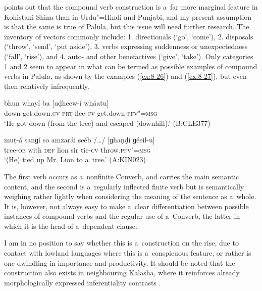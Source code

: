 \citet[20]{schmidt2004} points out that the compound verb construction is a~far more marginal feature in Kohistani Shina than in Urdu"=Hindi and Punjabi, and my present assumption is that the same is true of Palula, but this issue will need further research. The inventory of vectors commonly include: 1. directionals (`go', `come'), 2. disposals (`throw', `send', `put aside'), 3. verbs expressing suddenness or unexpectedness (`fall', `rise'), and 4. auto- and other benefactives (`give', `take'). Only categories 1 and 2 seem to appear in what can be termed as possible examples of compound verbs in Palula, as shown by the examples (\ref{ex:8-26}) and (\ref{ex:8-27}), but even then relatively infrequently. 

\begin{exe}
\ex
\label{ex:8-26}
\gll bhun whayí ba [uḍheew-í wháatu] \\
down get.down.\textsc{cv} \textsc{prt} flee-\textsc{cv} get.down-\textsc{pfv"=msg} \\
\glt `He got down (from the tree) and escaped (downhill).' (B:CLE377)
\end{exe}
\begin{exe}
\ex
\label{ex:8-27}
\gll muṭ-á sanɡí so amzarái seéb /{\ldots}/ [ɡhaṇḍí ɡéeil-u] \\
tree-\textsc{ob} with \textsc{def} lion sir {} tie-\textsc{cv} throw.\textsc{pfv"=msg} \\
\glt `(He) tied up Mr. Lion to a~tree.' (A:KIN023)
\end{exe}

The first verb occurs as a~nonfinite Converb, and carries the main semantic content, and the second is a~regularly inflected finite verb but is semantically weighing rather lightly when considering the meaning of the sentence as a~whole. It is, however, not always easy to make a~clear differentiation between possible instances of compound verbs and the regular use of a~Converb, the latter in which it is the head of a~dependent clause. 



I am in no position to say whether this is a~construction on the rise, due to contact with lowland languages where this is a~conspicuous feature, or rather is one dwindling in importance and productivity. It should be noted that the construction also exists in neighbouring Kalasha, where it reinforces already morphologically expressed inferentiality contrasts \citep[1--4]{bashir1993}.
